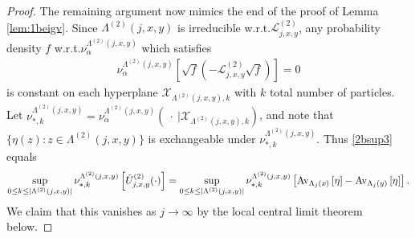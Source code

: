 \documentclass[11pt]{amsart}
\theoremstyle{plain}
\theoremstyle{definition}
\theoremstyle{remark}
\begin{document}
\begin{proof}
The remaining argument now mimics the end of the proof of Lemma \ref{lem:1beigv}. Since $\Lambda^{(2)}(j,x,y)$ is irreducible w.r.t.\@ $\mathcal{L}^{(2)}_{j,x,y}$, any probability density $f$ w.r.t.\@ $\nu_\alpha^{\Lambda^{(2)}(j,x,y)}$ which satisfies 
\begin{align*}
\nu_\alpha^{\Lambda^{(2)}(j,x,y)}\left[\sqrt{f}\left(-\mathcal{L}^{(2)}_{j,x,y} \sqrt{f}\right)\right]=0
\end{align*}
is constant on each hyperplane $\mathcal{X}_{\Lambda^{(2)}(j,x,y),k}$ with $k$ total number of particles. Let $\nu^{\Lambda^{(2)}(j,x,y)}_{*,k} = \nu^{\Lambda^{(2)}(j,x,y)}_\alpha\left(~\cdot~|\mathcal{X}_{\Lambda^{(2)}(j,x,y),k}\right)$, and note that $\{\eta(z): z\in \Lambda^{(2)}(j,x,y)\}$ is exchangeable under $\nu^{\Lambda^{(2)}(j,x,y)}_{*,k}$. Thus \eqref{2bsup3} equals
\begin{align}
\sup_{0\leq k\leq |\Lambda^{(2)}(j,x,y)|} \nu^{\Lambda^{(2)}(j,x,y)}_{*,k} \left[{\tilde{U}^{(2)}_{{{j}},{{x}},{{y}}}}(\cdot)\right] = \sup_{0\leq k \leq |\Lambda^{(2)}(j,x,y)|} \nu^{\Lambda^{(2)}(j,x,y)}_{*,k}  \left[{{\rm Av}_{{\Lambda_j(x)}}\left[{{\eta}}\right]}- {{\rm Av}_{{\Lambda_j(y)}}\left[{{\eta}}\right]}\right].
\end{align}
We claim that this vanishes as $j\to\infty$ by the local central limit theorem below.
\end{proof}
\end{document}
